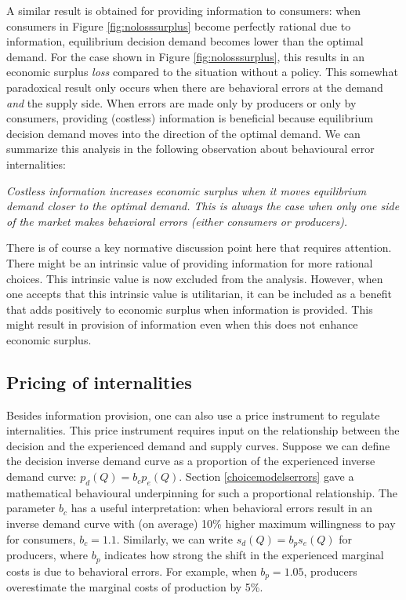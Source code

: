 \documentclass[
]{book}
\begin{document}
A similar result is obtained for providing information to consumers: when consumers in Figure \ref{fig:nolosssurplus} become perfectly rational due to information, equilibrium decision demand becomes lower than the optimal demand. For the case shown in Figure \ref{fig:nolosssurplus}, this results in an economic surplus \emph{loss} compared to the situation without a policy. This somewhat paradoxical result only occurs when there are behavioral errors at the demand \emph{and} the supply side. When errors are made only by producers or only by consumers, providing (costless) information is beneficial because equilibrium decision demand moves into the direction of the optimal demand. We can summarize this analysis in the following observation about behavioural error internalities:

\emph{Costless information increases economic surplus when it moves equilibrium demand closer to the optimal demand. This is always the case when only one side of the market makes behavioral errors (either consumers or producers).}

There is of course a key normative discussion point here that requires attention. There might be an intrinsic value of providing information for more rational choices. This intrinsic value is now excluded from the analysis. However, when one accepts that this intrinsic value is utilitarian, it can be included as a benefit that adds positively to economic surplus when information is provided. This might result in provision of information even when this does not enhance economic surplus.

\hypertarget{pricing-of-internalities}{%
\subsection{Pricing of internalities}\label{pricing-of-internalities}}

Besides information provision, one can also use a price instrument to regulate internalities. This price instrument requires input on the relationship between the decision and the experienced demand and supply curves. Suppose we can define the decision inverse demand curve as a proportion of the experienced inverse demand curve: \(p_d (Q)= b_c p_e (Q)\). Section \ref{choicemodelserrors} gave a mathematical behavioural underpinning for such a proportional relationship. The parameter \(b_c\) has a useful interpretation: when behavioral errors result in an inverse demand curve with (on average) 10\% higher maximum willingness to pay for consumers, \(b_c=1.1\). Similarly, we can write \(s_d (Q)= b_p s_e (Q)\) for producers, where \(b_p\) indicates how strong the shift in the experienced marginal costs is due to behavioral errors. For example, when \(b_p=1.05\), producers overestimate the marginal costs of production by 5\%.
\end{document}
